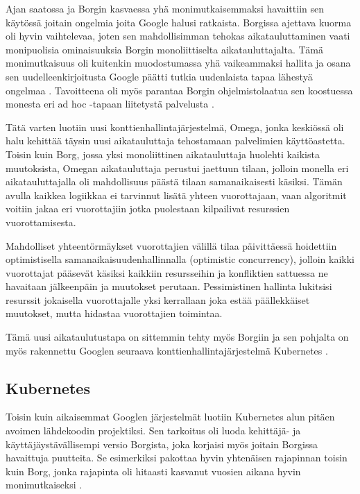 \documentclass[finnish,gradu]{tktltiki3}
\begin{document}
Ajan saatossa ja Borgin kasvaessa yhä monimutkaisemmaksi havaittiin sen käytössä joitain ongelmia joita Google halusi ratkaista. Borgissa ajettava kuorma oli hyvin vaihtelevaa, joten sen mahdollisimman tehokas aikatauluttaminen vaati monipuolisia ominaisuuksia Borgin monoliittiselta aikatauluttajalta. Tämä monimutkaisuus oli kuitenkin muodostumassa yhä vaikeammaksi hallita ja osana sen uudelleenkirjoitusta Google päätti tutkia uudenlaista tapaa lähestyä ongelmaa \cite{omega}. Tavoitteena oli myös parantaa Borgin ohjelmistolaatua sen koostuessa monesta eri ad hoc -tapaan liitetystä palvelusta \cite{borg-omega-kubernetes}.

Tätä varten luotiin uusi konttienhallintajärjestelmä, Omega, jonka keskiössä oli halu kehittää täysin uusi aikatauluttaja tehostamaan palvelimien käyttöastetta. Toisin kuin Borg, jossa yksi monoliittinen aikatauluttaja huolehti kaikista muutoksista, Omegan aikatauluttaja perustui jaettuun tilaan, jolloin monella eri aikatauluttajalla oli mahdollisuus päästä tilaan samanaikaisesti käsiksi. Tämän avulla kaikkea logiikkaa ei tarvinnut lisätä yhteen vuorottajaan, vaan algoritmit voitiin jakaa eri vuorottajiin jotka puolestaan kilpailivat resurssien vuorottamisesta.

Mahdolliset yhteentörmäykset vuorottajien välillä tilaa päivittäessä hoidettiin optimistisella samanaikaisuudenhallinnalla (optimistic concurrency), jolloin kaikki vuorottajat pääsevät käsiksi kaikkiin resursseihin ja konfliktien sattuessa ne havaitaan jälkeenpäin ja muutokset perutaan. Pessimistinen hallinta lukitsisi resurssit jokaisella vuorottajalle yksi kerrallaan joka estää päällekkäiset muutokset, mutta hidastaa vuorottajien toimintaa.

Tämä uusi aikataulutustapa on sittemmin tehty myös Borgiin ja sen pohjalta on myös rakennettu Googlen seuraava konttienhallintajärjestelmä Kubernetes \cite{omega}.

\subsection{Kubernetes}

Toisin kuin aikaisemmat Googlen järjestelmät luotiin Kubernetes alun pitäen avoimen lähdekoodin projektiksi. Sen tarkoitus oli luoda kehittäjä- ja käyttäjäystävällisempi versio Borgista, joka korjaisi myös joitain Borgissa havaittuja puutteita. Se esimerkiksi pakottaa hyvin yhtenäisen rajapinnan toisin kuin Borg, jonka rajapinta oli hitaasti kasvanut vuosien aikana hyvin monimutkaiseksi \cite{borg-omega-kubernetes}.
\end{document}
